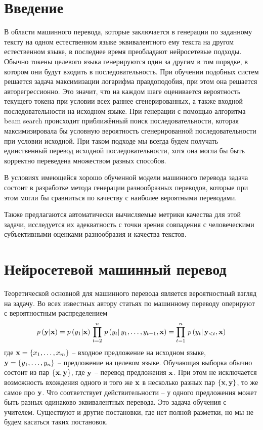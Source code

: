\documentclass[a4paper, 12pt]{extarticle}
\begin{document}
\section*{Введение}
    В области машинного перевода, которые заключается в генерации по заданному тексту на одном естественном языке эквивалентного ему текста на другом естественном языке, в последнее время преобладают нейросетевые подходы. Обычно токены целевого языка генерируются один за другим в том порядке, в котором они будут входить в последовательность. При обучении подобных систем решается задача максимизации логарифма правдоподобия, при этом она решается авторегрессионно. Это значит, что на каждом шаге оценивается вероятность текущего токена при условии всех раннее сгенерированных, а также входной последовательности на исходном языке. При генерации с помощью алгоритма beam search происходит приближённый поиск последовательности, которая максимизировала бы условную вероятность сгенерированной последовательности при условии исходной. При таком подходе мы всегда будем получать единственный перевод исходной последовательности, хотя она могла бы быть корректно переведена множеством разных способов.

    В условиях имеющейся хорошо обученной модели машинного перевода задача состоит в разработке метода генерации разнообразных переводов, которые при этом могли бы сравниться по качеству с наиболее вероятными переводами.

    Также предлагаются автоматически вычисляемые метрики качества для этой задачи, исследуется их адекватность с точки зрения совпадения с человеческими субъективными оценками разнообразия и качества текстов.

\newpage
\section{Нейросетевой машинный перевод}
    Теоретической основной для машинного перевода является вероятностный взгляд на задачу. Во всех известных автору статьях по машинному переводу оперируют с вероятностным распределением $$p \, (\bold{y}  |  \bold{x}) = p \, (y_1  |  \bold{x} ) \, \prod\limits_{t=2}^n \, p \, (y_t | \, y_1, \dots, y_{t - 1}, \bold{x} ) = \prod\limits_{t=1}^n \, p \, (y_t | \, \bold{y}_{< t}, \bold{x} )$$ где $\bold{x} = \{x_1, \dots, x_m\}$ -- входное предложение на исходном языке, $\bold{y} = \{y_1, \dots, y_n\}$ -- предложение на целевом языке. Обучающая выборка обычно состоит из пар $\{ \bold{x}, \bold{y} \}$, где $\bold{y}$ -- перевод предложения $\bold{x}$. При этом не исключается возможность вхождения одного и того же $\bold{x}$ в несколько разных пар $\{ \bold{x}, \bold{y} \}$, то же самое про $\bold{y}$. Что соответствует действительности -- у одного предложения может быть разных одинаково эквивалентных перевода. Это задача обучения с учителем. Существуют и другие постановки, где нет полной разметки, но мы не будем касаться таких постановок.
\end{document}
